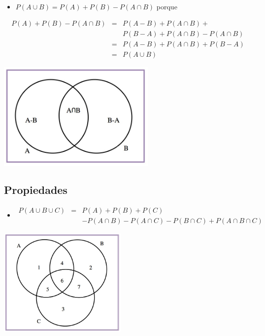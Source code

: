 \documentclass[]{book}
\providecommand{\tightlist}{%
  \setlength{\itemsep}{0pt}\setlength{\parskip}{0pt}}
\begin{document}
\begin{itemize}
\tightlist
\item
  \(P(A\cup B)=P(A)+P(B)-P(A\cap B)\) porque
\end{itemize}

\begin{eqnarray*}
P(A)+P(B)-P(A\cap B) &=& P(A-B)+P(A\cap B)+\\
 & & P(B-A)+ P(A\cap  B)-P(A\cap  B)\\
&=& P(A-B)+P(A\cap B)+ P(B-A) \\
&=& P(A\cup B)
\end{eqnarray*}

\includegraphics[width=\textwidth,height=2.08333in]{Images/proba1dibujos/A-B.jpg}

\hypertarget{propiedades-10}{%
\subsection{Propiedades}\label{propiedades-10}}

\begin{itemize}
\tightlist
\item
  \begin{eqnarray*}
  P(A\cup B\cup C)&=&P(A)+P(B)+P(C)  \\ &&-P(A\cap B)-P(A\cap C)-P(B\cap C)  +P(A\cap B\cap C)
  \end{eqnarray*}
\end{itemize}

\includegraphics[width=\textwidth,height=2.08333in]{Images/proba1dibujos/tresconjunts.jpg}
\end{document}
